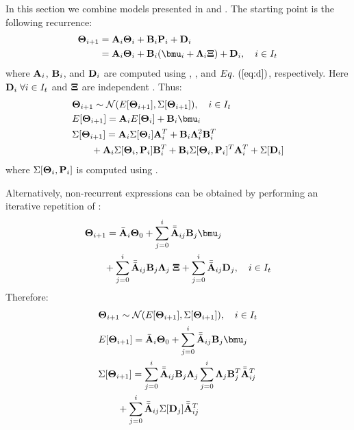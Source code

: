 In this section we combine models presented in  and . The starting point is the following recurrence:
\begin{align}
  \vtemperature_{i + 1} & = \m{A}_i \vtemperature_i + \m{B}_i \vpower_i + \m{D}_i \nonumber \\
  & = \m{A}_i \vtemperature_i + \m{B}_i(\vmean{i} + \ddeviation{i} \vstdnormal) + \m{D}_i, \sep i \in \timeindex \equlabel{fourier-recurrence-noise-process-variation}
\end{align}
where $\mathbf{A}_i$, $\mathbf{B}_i$, and $\mathbf{D}_i$ are computed using , , and $\equref{d}$, respectively. Here $\mathbf{D}_i \; \forall i \in I_t$ and $\mathbf{\Xi}$ are independent \mnrvs. Thus:
\begin{align*}
  & \vtemperature_{i + 1} \sim \normal(\expectation{\vtemperature_{i + 1}}, \covariance{\vtemperature_{i + 1}}), \sep i \in \timeindex \\
  & \expectation{\vtemperature_{i + 1}} = \m{A}_i \expectation{\vtemperature_i} + \m{B}_i \vmean{i} \\
  & \covariance{\vtemperature_{i + 1}} = \m{A}_i \covariance{\vtemperature_i} \m{A}_i^T + \m{B}_i \ddeviation{i}^2 \m{B}_i^T \\
  & {} \qquad + \m{A}_i \covariance{\vtemperature_i, \vpower_i} \m{B}_i^T + \m{B}_i \covariance{\vtemperature_i, \vpower_i}^T \m{A}_i^T + \covariance{\m{D}_i}
\end{align*}
where $\Sigma[\mathbf{\Theta}_i, \mathbf{P}_i]$ is computed using .

Alternatively, non-recurrent expressions can be obtained by performing an iterative repetition of :
\begin{align*}
  & \vtemperature_{i + 1} = \aone_i \vtemperature_0 + \sum_{j = 0}^{i} \atwo_{ij} \m{B}_j \vmean{j} \\
  & {} \qquad + \sum_{j = 0}^{i} \atwo_{ij} \m{B}_j \ddeviation{j} \; \vstdnormal + \sum_{j = 0}^{i} \atwo_{ij} \m{D}_j, \sep i \in \timeindex
\end{align*}
Therefore:
\begin{align*}
  & \vtemperature_{i + 1} \sim \normal(\expectation{\vtemperature_{i + 1}}, \covariance{\vtemperature_{i + 1}}), \sep i \in \timeindex \\
  & \expectation{\vtemperature_{i + 1}} = \aone_i \vtemperature_0 + \sum_{j = 0}^{i} \atwo_{ij} \m{B}_j \vmean{j} \\
  & \covariance{\vtemperature_{i + 1}} = \sum_{j = 0}^{i} \atwo_{ij} \m{B}_j \ddeviation{j} \sum_{j = 0}^{i} \ddeviation{j} \m{B}_j^T \atwo_{ij}^T \\
  & {} \qquad + \sum_{j = 0}^{i} \atwo_{ij} \covariance{\m{D}_j} \atwo_{ij}^T
\end{align*}
